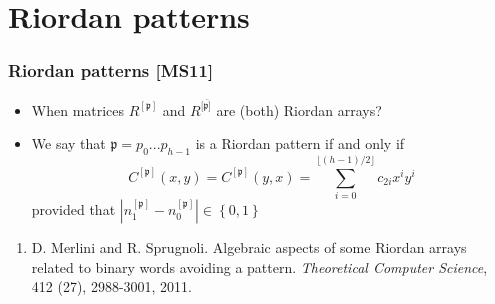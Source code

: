 \documentclass{beamer}
\begin{document}
\section{Riordan patterns}

\begin{frame}\frametitle{Riordan patterns {\tiny [MS11]}}
\begin{itemize}
\item
When matrices
${{R}^{[\mathfrak{p}]}}$ and ${{R}^{[\bar{\mathfrak{p}]}}}$ are (both) Riordan arrays?
\item
We say that $\mathfrak{p}=p_0...p_{h-1}$ is a Riordan pattern if
and only if
$$C^{[\mathfrak{p}]}(x,y)=C^{[\mathfrak{p}]}(y,x)=
\sum_{i=0}^{\lfloor(h-1)/2\rfloor}c_{2i}x^iy^i$$
provided that $\left|n_1^{[\mathfrak{p}]}-n_0^{[\mathfrak{p}]}\right|\in \left\{0,1\right\}$
\end{itemize}
\begin{enumerate}
\item {\small D. Merlini and R. Sprugnoli. Algebraic aspects of some Riordan arrays related to binary words avoiding a pattern.
{\em Theoretical Computer Science}, 412 (27), 2988-3001, 2011.}
\end{enumerate}

\end{frame}


\end{document}
